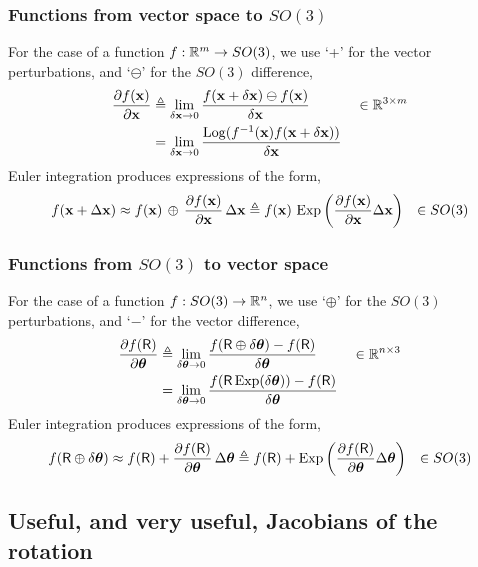 \subsubsection{Functions from vector space to $SO(3)$}

For the case of a function $f:{\mathbb R}^m\to SO(3)$, we use `+' for the vector perturbations, and `$\ominus$' for the $SO(3)$ difference,
%
\begin{align}
\frac{\partial f({\bf x})}{\partial{\bf x}} &\triangleq \lim_{\delta{\bf x}\to0} \frac{ f({\bf x}+\delta{\bf x})\ominus f({\bf x})}{\delta{\bf x}} && \in {\mathbb R}^{3\times m} \label{equ:dif_RtoSO3}\\
&= \lim_{\delta{\bf x}\to0} \frac{\operatorname*{Log}(f^{-1}({\bf x}) f({\bf x}+\delta{\bf x}))}{\delta{\bf x}}
\end{align}
%
Euler integration produces expressions of the form,
%
\begin{align*}
f({\bf x}+\Delta{\bf x}) &\approx f({\bf x})\,\oplus\,\frac{\partial f({\bf x})}{\partial{\bf x}}\,\Delta{\bf x}
 \triangleq f({\bf x})\,\operatorname*{Exp}\left(\frac{\partial f({\bf x})}{\partial{\bf x}}\Delta{\bf x}\right)
 & \in SO(3)
\end{align*}

\subsubsection{Functions from $SO(3)$ to vector space}

For the case of a function $f: SO(3)\to{\mathbb R}^n$, we use `$\oplus$' for the $SO(3)$ perturbations, and `$-$' for the vector difference,
%
\begin{align}
\frac{\partial f(\mathsf R)}{\partial{\bm \theta}} &\triangleq \lim_{\delta{\bm \theta}\to0} \frac{f(\mathsf R\oplus\delta{\bm \theta}) - f(\mathsf R)}{\delta{\bm \theta}} && \in {\mathbb R}^{n\times 3} \label{equ:jacobian_SO3_Rn}\\
&= \lim_{\delta{\bm \theta}\to0} \frac{f(\mathsf R\operatorname*{Exp}(\delta{\bm \theta})) - f(\mathsf R)}{\delta{\bm \theta}}
\end{align}
%
Euler integration produces expressions of the form,
%
\begin{align*}
f(\mathsf R\oplus\delta{\bm \theta}) &\approx f(\mathsf R)+\frac{\partial f(\mathsf R)}{\partial{\bm \theta}}\,\Delta{\bm \theta}
 \triangleq f(\mathsf R)+\operatorname*{Exp}\left(\frac{\partial f(\mathsf R)}{\partial{\bm \theta}}\Delta{\bm \theta}\right)
 & \in SO(3)
\end{align*}


\subsection{Useful, and very useful, Jacobians of the rotation}

